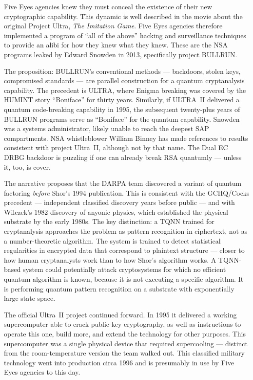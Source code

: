 Five Eyes agencies knew they must conceal the existence of their new cryptographic capability. This dynamic is well described in the movie about the original Project Ultra, \textit{The Imitation Game}. Five Eyes agencies therefore implemented a program of ``all of the above'' hacking and surveillance techniques to provide an alibi for how they knew what they knew. These are the NSA programs leaked by Edward Snowden in 2013, specifically project BULLRUN\@.

The proposition: BULLRUN's conventional methods --- backdoors, stolen keys, compromised standards --- are parallel construction for a quantum cryptanalysis capability. The precedent is ULTRA, where Enigma breaking was covered by the HUMINT story ``Boniface'' for thirty years. Similarly, if ULTRA~II delivered a quantum code-breaking capability in 1995, the subsequent twenty-plus years of BULLRUN programs serve as ``Boniface'' for the quantum capability. Snowden was a systems administrator, likely unable to reach the deepest SAP compartments. NSA whistleblower William Binney has made references to results consistent with project Ultra~II, although not by that name. The Dual EC DRBG backdoor is puzzling if one can already break RSA quantumly --- unless it, too, is cover.

The narrative proposes that the DARPA team discovered a variant of quantum factoring \textit{before} Shor's 1994 publication. This is consistent with the GCHQ/Cocks precedent --- independent classified discovery years before public --- and with Wilczek's 1982 discovery of anyonic physics, which established the physical substrate by the early 1980s. The key distinction: a TQNN trained for cryptanalysis approaches the problem as pattern recognition in ciphertext, not as a number-theoretic algorithm. The system is trained to detect statistical regularities in encrypted data that correspond to plaintext structure --- closer to how human cryptanalysts work than to how Shor's algorithm works. A TQNN-based system could potentially attack cryptosystems for which no efficient quantum algorithm is known, because it is not executing a specific algorithm. It is performing quantum pattern recognition on a substrate with exponentially large state space.

The official Ultra~II project continued forward. In 1995 it delivered a working supercomputer able to crack public-key cryptography, as well as instructions to operate this one, build more, and extend the technology for other purposes. This supercomputer was a single physical device that required supercooling --- distinct from the room-temperature version the team walked out. This classified military technology went into production circa 1996 and is presumably in use by Five Eyes agencies to this day.

